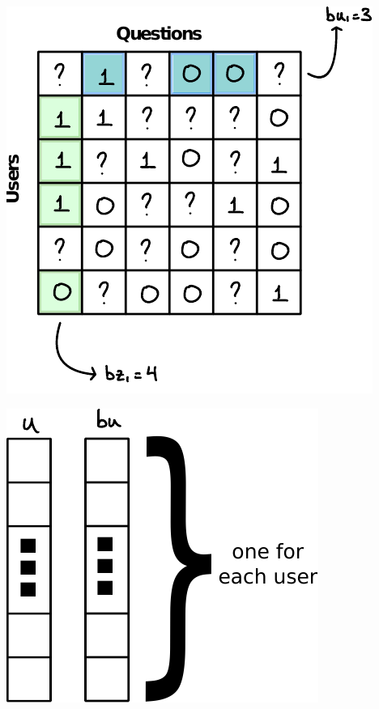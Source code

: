 \documentclass{article}
\begin{document}
\begin{enumerate}[label=\arabic*.]
        \begin{minipage}[c]{0.35\linewidth}
            \includegraphics[width=\linewidth]{./images/train_sparse_bias.pdf}
            \label{sparsebias}
        \end{minipage}\hfill
        \begin{minipage}[c]{0.6\linewidth}
            \begin{minipage}{0.4\linewidth}
                \includegraphics[width=\linewidth]{./images/bias_user.pdf}

\end{minipage}
\end{minipage}
\end{enumerate}
\end{document}
